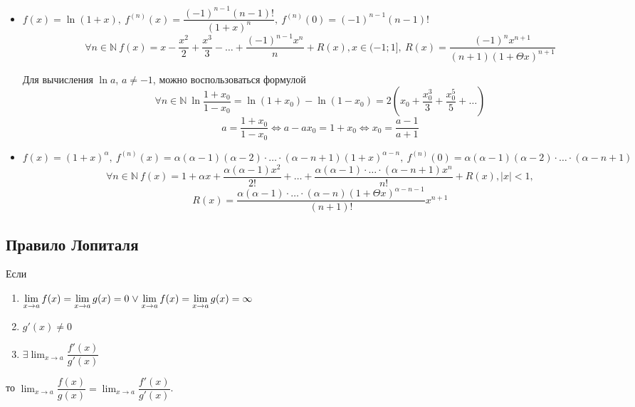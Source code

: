 \begin{itemize}
	\item $f(x) = \ln (1 + x), \
	f^{(n)}(x) = \dfrac{(-1)^{n-1} (n - 1)!}{(1 + x)^n}, \
	f^{(n)}(0) = (-1)^{n-1} (n - 1)!$
	\begin{equation*}
	\forall n \in \mathbb N \ f(x) = x - \frac{x^2}2 + \frac{x^3}3 - \ldots + \frac{(-1)^{n-1} x^n}n + R(x), x \in (-1; 1], \
	R(x) = \frac{(-1)^n x^{n+1}}{(n + 1)(1 + \Theta x)^{n+1}}
	\end{equation*}
	
	Для вычисления $\ln a$, $a \neq -1$, можно воспользоваться формулой
	\begin{equation*}
	\forall n \in \mathbb N \ \ln \frac{1 + x_0}{1 - x_0} = \ln (1 + x_0) - \ln (1 - x_0) =
	2 \left( x_0 + \frac{x_0^3}3 + \frac{x_0^5}5 + \ldots \right)
	\end{equation*}
	\begin{equation*}
	a = \frac{1 + x_0}{1 - x_0} \Leftrightarrow
	a - a x_0 = 1 + x_0 \Leftrightarrow
	x_0 = \frac{a - 1}{a + 1}
	\end{equation*}
	
	\item $f(x) = (1 + x)^\alpha, \
	f^{(n)}(x) = \alpha (\alpha - 1) (\alpha - 2) \cdot \ldots \cdot (\alpha - n + 1) (1 + x)^{\alpha - n}, \
	f^{(n)}(0) = \alpha (\alpha - 1) (\alpha - 2) \cdot \ldots \cdot (\alpha - n + 1)$
	\begin{equation*}
	\forall n \in \mathbb N \ f(x) = 1 + \alpha x + \frac{\alpha (\alpha - 1) x^2}{2!} + \ldots + \frac{\alpha (\alpha - 1) \cdot \ldots \cdot (\alpha - n + 1) x^n}{n!} + R(x), |x| < 1,
	\end{equation*}
	\begin{equation*}
	R(x) = \frac{\alpha (\alpha - 1) \cdot \ldots \cdot (\alpha - n) (1 + \Theta x)^{\alpha-n-1}}{(n + 1)!} x^{n+1}
	\end{equation*}
\end{itemize}

\subsection{Правило Лопиталя}
\begin{theorem}[правило Лопиталя]
Если
\begin{enumerate}
	\item $\displaystyle \lim_{x \to a} f(x) = \lim_{x \to a} g(x) = 0 \mathrel{\lor}
	\lim_{x \to a} f(x) = \lim_{x \to a} g(x) = \infty$
	\item $g'(x) \neq 0$
	\item $\displaystyle \exists \lim_{x \to a} \dfrac{f'(x)}{g'(x)}$	
\end{enumerate}
то $\displaystyle \lim_{x \to a} \dfrac{f(x)}{g(x)} = \lim_{x \to a} \dfrac{f'(x)}{g'(x)}$.
\end{theorem}

